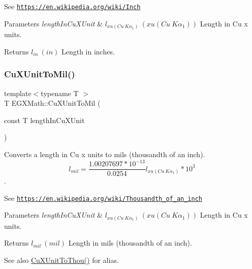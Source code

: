 See \href{https://en.wikipedia.org/wiki/Inch}{\tt https\+://en.\+wikipedia.\+org/wiki/\+Inch} 
\begin{DoxyParams}{Parameters}
{\em length\+In\+Cu\+X\+Unit} & $ l_{xu(Cu\ K\alpha_1)}\ (xu(Cu\ K\alpha_1))$ Length in Cu x units. \\
\hline
\end{DoxyParams}
\begin{DoxyReturn}{Returns}
$ l_{in}\ (in)$ Length in inches. 
\end{DoxyReturn}
\mbox{\label{group___e_g_x_math-_conversions-_length_conversions-_non-_s_i-_cu_x_unit-_imperial_ga060d8ffc384bcba07e0fde612e1a2156}} 
\subsubsection{\texorpdfstring{Cu\+X\+Unit\+To\+Mil()}{CuXUnitToMil()}}
{\footnotesize\ttfamily template$<$typename T $>$ \\
T E\+G\+X\+Math\+::\+Cu\+X\+Unit\+To\+Mil (\begin{DoxyParamCaption}\item[{const T}]{length\+In\+Cu\+X\+Unit }\end{DoxyParamCaption})}



Converts a length in Cu x units to mils (thousandth of an inch). \[ l_{mil}= \frac{1.00207697*10^{-13}}{0.0254} l_{xu(Cu\ K\alpha_1)} * 10^{3} \]. 

See \href{https://en.wikipedia.org/wiki/Thousandth_of_an_inch}{\tt https\+://en.\+wikipedia.\+org/wiki/\+Thousandth\+\_\+of\+\_\+an\+\_\+inch} 
\begin{DoxyParams}{Parameters}
{\em length\+In\+Cu\+X\+Unit} & $ l_{xu(Cu\ K\alpha_1)}\ (xu(Cu\ K\alpha_1))$ Length in Cu x units. \\
\hline
\end{DoxyParams}
\begin{DoxyReturn}{Returns}
$ l_{mil}\ (mil)$ Length in mils (thousandth of an inch). 
\end{DoxyReturn}
\begin{DoxySeeAlso}{See also}
\mbox{\hyperlink{group___e_g_x_math-_conversions-_length_conversions-_non-_s_i-_cu_x_unit-_imperial_ga3d9558a94551b20c5492dba8f01fcff6}{Cu\+X\+Unit\+To\+Thou()}} for alias. 
\end{DoxySeeAlso}
\mbox{\label{group___e_g_x_math-_conversions-_length_conversions-_non-_s_i-_cu_x_unit-_imperial_gaa1fe76010dc4559641c3bd31bd0f2c3e}} 
